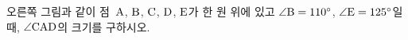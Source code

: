 \noindent\begin{minipage}[t]{0.58\linewidth}\vspace{0pt}\raggedright 오른쪽 그림과 같이 점~$\mathrm{A}$, $\mathrm{B}$, $\mathrm{C}$, $\mathrm{D}$, $\mathrm{E}$가 한 원 위에 있고 $\angle\mathrm{B}=110^\circ$, $\angle\mathrm{E}=125^\circ$일 때, $\angle\mathrm{CAD}$의 크기를 구하시오.\end{minipage}\hfill\begin{minipage}[t]{0.4\linewidth}\vspace{0pt}\centering \resizebox{\ifdim\width>\linewidth\linewidth\else\width\fi}{!}{}\end{minipage}\par
